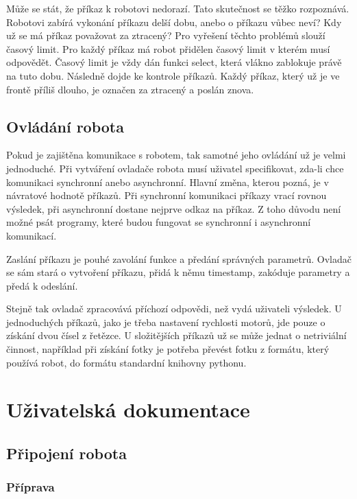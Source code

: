 \documentclass[12pt,notitlepage]{report}
\begin{document}
    Může se stát, že příkaz k robotovi nedorazí. Tato skutečnost se těžko
    rozpoznává. Robotovi zabírá vykonání příkazu delší dobu, anebo o příkazu
    vůbec neví? Kdy už se má příkaz považovat za ztracený? Pro vyřešení těchto
    problémů slouží časový limit. Pro každý příkaz má robot přidělen časový
    limit v kterém musí odpovědět. Časový limit je vždy dán funkci select,
    která vlákno zablokuje právě na tuto dobu. Následně dojde ke kontrole
    příkazů. Každý příkaz, který už je ve frontě příliš dlouho, je označen za
    ztracený a poslán znova.

    \section{Ovládání robota}
    \label{controller}

    Pokud je zajištěna komunikace s robotem, tak samotné jeho ovládání už je
    velmi jednoduché. Při vytváření ovladače robota musí uživatel specifikovat,
    zda-li chce komunikaci synchronní anebo asynchronní. Hlavní změna, kterou
    pozná, je v návratové hodnotě příkazů. Při synchronní komunikaci příkazy
    vrací rovnou výsledek, při asynchronní dostane nejprve odkaz na příkaz. Z
    toho důvodu není možné psát programy, které budou fungovat se synchronní i
    asynchronní komunikací.

    Zaslání příkazu je pouhé zavolání funkce a předání správných parametrů.
    Ovladač se sám stará o vytvoření příkazu, přidá k němu timestamp, zakóduje
    parametry a předá k odeslání.

    Stejně tak ovladač zpracovává příchozí odpovědi, než vydá uživateli
    výsledek. U jednoduchých příkazů, jako je třeba nastavení rychlosti motorů,
    jde pouze o získání dvou čísel z řetězce. U složitějších příkazů už se může
    jednat o netriviální činnost, například při získání fotky je potřeba
    převést fotku z formátu, který používá robot, do formátu standardní
    knihovny pythonu.

\chapter{Uživatelská dokumentace}

    \section{Připojení robota}

    \subsection{Příprava}
\end{document}
